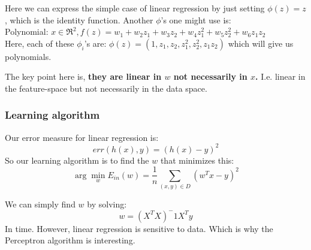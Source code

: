     Here we can express the simple case of linear regression by just setting 
    $\phi(z) = z$, which is the identity function. Another $\phi$'s one might 
    use is:\\
    Polynomial: $x\in \Re^2, 
    f(z)=w_1+w_2z_1+w_3z_2+w_4z_1^2+w_5z_2^2+w_6z_1z_2$\\
    Here, each of these $\phi_i$'s are: $\phi(z)=(1,z_1, z_2, z_1^2, z_2^2, 
    z_1z_2)$ which will give us polynomials.
    
   The key point here is, \textbf{they are linear in $w$ not necessarily in 
   $x$.} I.e. linear in the feature-space but not necessarily in the data space.

    \subsubsection{Learning algorithm}
    Our error measure for linear regression is:
    \begin{equation*}
        err(h(x),y)=(h(x)-y)^2
    \end{equation*}
    So our learning algorithm is to find the $w$ that minimizes this:
    \begin{equation*}
        \arg\min\limits_w E_{in}(w)=\frac{1}{n}\sum_{(x,y)\in D}(w^Tx - y)^2
    \end{equation*}

    We can simply find $w$ by solving:
    \begin{equation*}
        w=(X^TX)^-1X^Ty
    \end{equation*}
    In  time. However, linear regression is sensitive to data. Which 
    is why the Perceptron algorithm is interesting.

